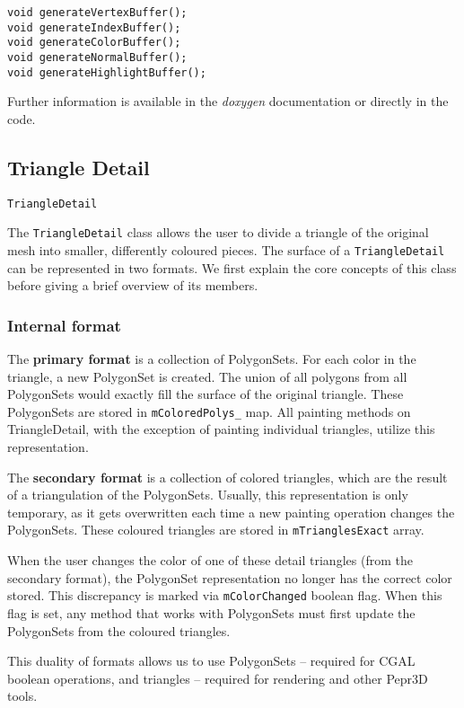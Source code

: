 \begin{lstlisting}
void generateVertexBuffer();
void generateIndexBuffer();
void generateColorBuffer();
void generateNormalBuffer();
void generateHighlightBuffer();
\end{lstlisting}

Further information is available in the \textit{doxygen} documentation or directly in the code.

\subsection{Triangle Detail}

\texttt{TriangleDetail}

The \texttt{TriangleDetail} class allows the user to divide a triangle of the original mesh into smaller, differently coloured pieces. The surface of a \texttt{Triangle\-Detail} can be represented in two formats. We first explain the core concepts of this class before giving a brief overview of its members.

\subsubsection{Internal format}

The \textbf{primary format} is a collection of PolygonSets. For each color in the triangle, a new PolygonSet is created. The union of all polygons from all PolygonSets would exactly fill the surface of the original triangle. These PolygonSets are stored in \texttt{mColoredPolys\_} map. All painting methods on TriangleDetail, with the exception of painting individual triangles, utilize this representation. 

The \textbf{secondary format} is a collection of colored triangles, which are the result of a triangulation of the PolygonSets. Usually, this representation is only temporary, as it gets overwritten each time a new painting operation changes the PolygonSets. These coloured triangles are stored in \texttt{mTrianglesExact} array.

When the user changes the color of one of these detail triangles (from the secondary format), the PolygonSet representation no longer has the correct color stored. This discrepancy is marked via \texttt{mColorChanged} boolean flag. When this flag is set, any method that works with PolygonSets must first update the PolygonSets from the coloured triangles.

This duality of formats allows us to use PolygonSets -- required for CGAL boolean operations, and triangles -- required for rendering and other Pepr3D tools.

